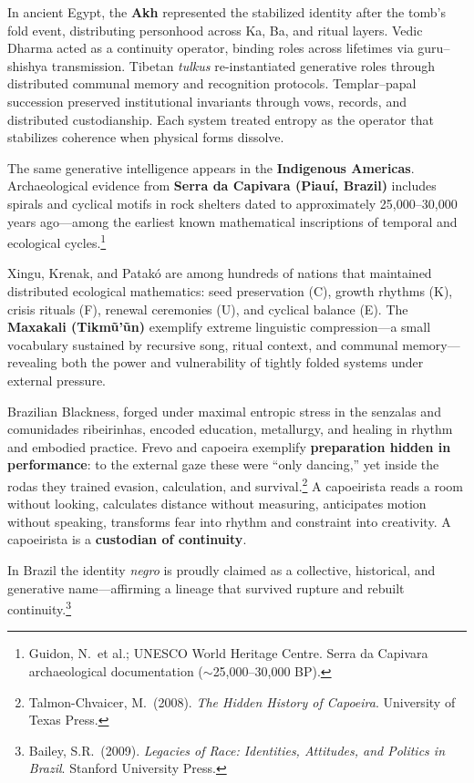 \documentclass[14pt, twoside, openright]{book}
\theoremstyle{definition}
\theoremstyle{remark}
\begin{document}
In ancient Egypt, the \textbf{Akh} represented the stabilized identity after the
tomb's fold event, distributing personhood across Ka, Ba, and ritual layers.
Vedic Dharma acted as a continuity operator, binding roles across lifetimes via
guru--shishya transmission. Tibetan \textit{tulkus} re-instantiated generative
roles through distributed communal memory and recognition protocols.
Templar--papal succession preserved institutional invariants through vows, records,
and distributed custodianship. Each system treated entropy as the operator that
stabilizes coherence when physical forms dissolve.

The same generative intelligence appears in the \textbf{Indigenous Americas}.
Archaeological evidence from \textbf{Serra da Capivara (Piau\'{i}, Brazil)}
includes spirals and cyclical motifs in rock shelters dated to approximately
25,000--30,000 years ago---among the earliest known mathematical inscriptions of
temporal and ecological cycles.\footnote{Guidon, N.\ et al.; UNESCO World
Heritage Centre. Serra da Capivara archaeological documentation
($\sim$25,000--30,000 BP).}

Xingu, Krenak, and Patak\'{o} are among hundreds of nations that maintained
distributed ecological mathematics: seed preservation (C), growth rhythms (K),
crisis rituals (F), renewal ceremonies (U), and cyclical balance (E). The
\textbf{Maxakali (Tikm\~{u}'\~{u}n)} exemplify extreme linguistic
compression---a small vocabulary sustained by recursive song, ritual context, and
communal memory---revealing both the power and vulnerability of tightly folded
systems under external pressure.

Brazilian Blackness, forged under maximal entropic stress in the senzalas and
comunidades ribeirinhas, encoded education, metallurgy, and healing in rhythm and
embodied practice. Frevo and capoeira exemplify \textbf{preparation hidden in
performance}: to the external gaze these were ``only dancing,'' yet inside the
rodas they trained evasion, calculation, and survival.\footnote{Talmon-Chvaicer,
M.\ (2008). \textit{The Hidden History of Capoeira}. University of Texas Press.}
A capoeirista reads a room without looking, calculates distance without measuring,
anticipates motion without speaking, transforms fear into rhythm and constraint
into creativity. A capoeirista is a \textbf{custodian of continuity}.

In Brazil the identity \textit{negro} is proudly claimed as a collective,
historical, and generative name---affirming a lineage that survived rupture and
rebuilt continuity.\footnote{Bailey, S.R.\ (2009). \textit{Legacies of Race:
Identities, Attitudes, and Politics in Brazil}. Stanford University Press.}
\end{document}
